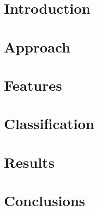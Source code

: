 \documentclass[a4paper]{article}
\begin{document}
\newpage

\section{Introduction}


\section{Approach}


\section{Features}


\section{Classification}


\section{Results}


\section{Conclusions}
\end{document}

